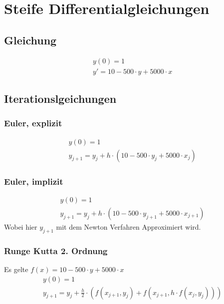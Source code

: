 \documentclass[10pt]{scrartcl}
\author{Oliver Steenbuck, Karolina Bernat}
\title{\titletext}
\date{31.10.2012}
\begin{document}
\maketitle
\setcounter{tocdepth}{3}
\tableofcontents
\listoffigures
\lstlistoflistings


\section{Steife Differentialgleichungen}
\subsection{Gleichung}
	\begin{align}
		&y(0)=1\\
		&y'=10-500 \cdot y + 5000 \cdot x
	\end{align}
	
	\subsection{Iterationslgeichungen}	
	
	\subsubsection{Euler, explizit}
	\begin{align}
		&y(0)=1\\
		&y_{j+1}=y_{j} + h \cdot (10-500 \cdot y_{j} + 5000 \cdot x_j)
	\end{align}
	
	\subsubsection{Euler, implizit}
	\begin{align}
		&y(0)=1\\
		&y_{j+1}=y_{j} + h \cdot (10-500 \cdot y_{j+1} + 5000 \cdot x_{j+1})
	\end{align}
	Wobei hier $y_{j+1}$ mit dem Newton Verfahren Approximiert wird.
	
	\subsubsection{Runge Kutta 2. Ordnung}
	Es gelte $f(x) = 10-500 \cdot y + 5000 \cdot x$ 
	\begin{align}
		&y(0)=1\\
		&y_{j+1}=y_{j} + \frac{h}{2} \cdot (f(x_{j+1}, y_{j}) + f(x_{j+1}, h \cdot f(x_j, y_j)) )
	\end{align}
\end{document}
